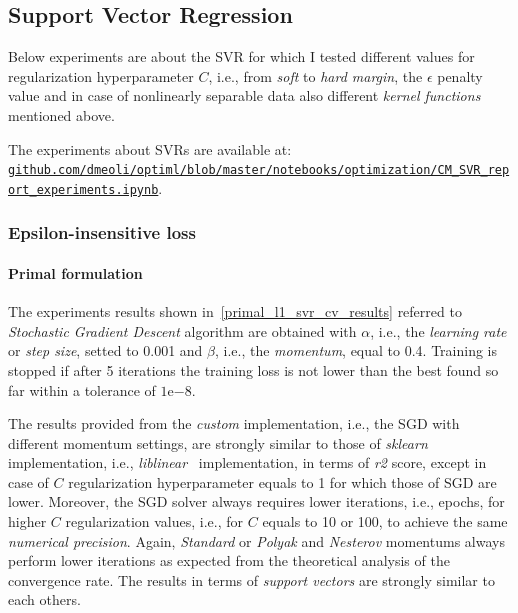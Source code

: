 \pagebreak

\subsection{Support Vector Regression}

Below experiments are about the SVR for which I tested different values for regularization hyperparameter $C$, i.e., from \emph{soft} to \emph{hard margin}, the $\epsilon$ penalty value and in case of nonlinearly separable data also different \emph{kernel functions} mentioned above.

The experiments about SVRs are available at: \\ \href{https://github.com/dmeoli/optiml/blob/master/notebooks/optimization/CM_SVR_report_experiments.ipynb}{\texttt{github.com/dmeoli/optiml/blob/master/notebooks/optimization/CM\_SVR\_report\_experiments.ipynb}}.

\subsubsection{Epsilon-insensitive loss}

\paragraph{Primal formulation}

The experiments results shown in~\ref{primal_l1_svr_cv_results} referred to \emph{Stochastic Gradient Descent} algorithm are obtained with $\alpha$, i.e., the \emph{learning rate} or \emph{step size}, setted to 0.001 and $\beta$, i.e., the \emph{momentum}, equal to 0.4. Training is stopped if after 5 iterations the training loss is not lower than the best found so far within a tolerance of $1\mathrm{e}{-8}$.



The results provided from the \emph{custom} implementation, i.e., the SGD with different momentum settings, are strongly similar to those of \emph{sklearn} implementation, i.e., \emph{liblinear}~\cite{fan2008liblinear} implementation, in terms of \emph{r2} score, except in case of $C$ regularization hyperparameter equals to 1 for which those of SGD are lower. Moreover, the SGD solver always requires lower iterations, i.e., epochs, for higher $C$ regularization values, i.e., for $C$ equals to 10 or 100, to achieve the same \emph{numerical precision}. Again, \emph{Standard} or \emph{Polyak} and \emph{Nesterov} momentums always perform lower iterations as expected from the theoretical analysis of the convergence rate. The results in terms of \emph{support vectors} are strongly similar to each others.

